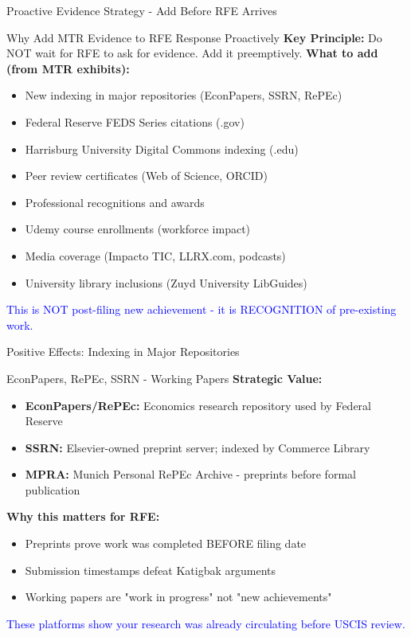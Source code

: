 \documentclass[11pt]{beamer}
\begin{document}
	\begin{frame}{Proactive Evidence Strategy - Add Before RFE Arrives}
		\scriptsize
		\begin{block}{Why Add MTR Evidence to RFE Response Proactively}
			\textbf{Key Principle:} Do NOT wait for RFE to ask for evidence. Add it preemptively.
			\vspace{0.2cm}
			\textbf{What to add (from MTR exhibits):}
			\begin{itemize}
				\item New indexing in major repositories (EconPapers, SSRN, RePEc)
				\item Federal Reserve FEDS Series citations (.gov)
				\item Harrisburg University Digital Commons indexing (.edu)
				\item Peer review certificates (Web of Science, ORCID)
				\item Professional recognitions and awards
				\item Udemy course enrollments (workforce impact)
				\item Media coverage (Impacto TIC, LLRX.com, podcasts)
				\item University library inclusions (Zuyd University LibGuides)
			\end{itemize}
			\textcolor{blue}{This is NOT post-filing new achievement - it is RECOGNITION of pre-existing work.}
		\end{block}
	\end{frame}
	
	\begin{frame}{Positive Effects: Indexing in Major Repositories}
		\scriptsize
		\begin{block}{EconPapers, RePEc, SSRN - Working Papers}
			\textbf{Strategic Value:}
			\begin{itemize}
				\item \textbf{EconPapers/RePEc:} Economics research repository used by Federal Reserve
				\item \textbf{SSRN:} Elsevier-owned preprint server; indexed by Commerce Library
				\item \textbf{MPRA:} Munich Personal RePEc Archive - preprints before formal publication
			\end{itemize}
			\textbf{Why this matters for RFE:}
			\begin{itemize}
				\item Preprints prove work was completed BEFORE filing date
				\item Submission timestamps defeat Katigbak arguments
				\item Working papers are "work in progress" not "new achievements"
			\end{itemize}
			\textcolor{blue}{These platforms show your research was already circulating before USCIS review.}
		\end{block}
	\end{frame}
	
\end{document}
